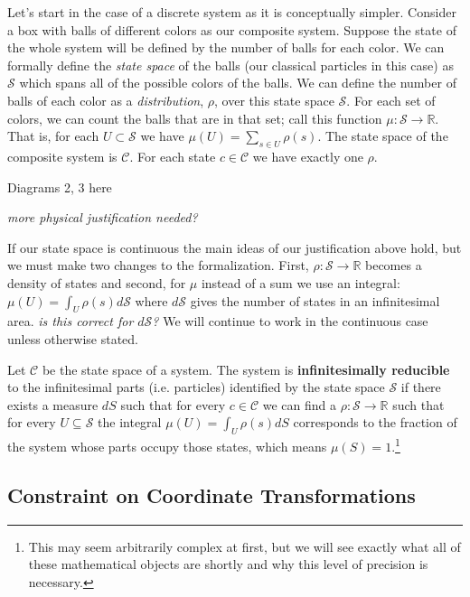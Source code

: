\documentclass{article}
\begin{document}
	Let's start in the case of a discrete system as it is conceptually simpler. Consider a box with balls of different colors as our composite system. Suppose the state of the whole system will be defined by the number of balls for each color. We can formally define the \textit{state space} of the balls (our classical particles in this case) as $\mathcal{S}$ which spans all of the possible colors of the balls. We can define the number of balls of each color as a \textit{distribution}, $\rho$, over this state space $\mathcal{S}$. For each set of colors, we can count the balls that are in that set; call this function $\mu : \mathcal{S} \to \mathbb{R}$. That is, for each $U \subset \mathcal{S}$ we have $\mu(U) = \sum_{s \in U} \rho(s)$. The state space of the composite system is $\mathcal{C}$. For each state $c \in \mathcal{C}$ we have exactly one $\rho$.
	
Diagrams 2, 3 here
	
	\emph{more physical justification needed?}

	If our state space is continuous the main ideas of our justification above hold, but we must make two changes to the formalization. First, $\rho : \mathcal{S} \to \mathbb{R}$ becomes a density of states and second, for $\mu$ instead of a sum we use an integral: $\mu(U) = \int_{U} \rho(s) d\mathcal{S}$ where $d\mathcal{S}$ gives the number of states in an infinitesimal area. \emph{is this correct for $d\mathcal{S}$?} We will continue to work in the continuous case unless otherwise stated.
	
\begin{defn}
	Let $\mathcal{C}$ be the state space of a system. The system is \textbf{infinitesimally reducible} to the infinitesimal parts (i.e. particles) identified by the state space $\mathcal{S}$ if there exists a measure $dS$ such that for every $c \in \mathcal{C}$ we can find a $\rho : \mathcal{S} \to \mathbb{R}$ such that for every $U \subseteq \mathcal{S}$ the integral $\mu(U) = \int_U \rho(s) dS$ corresponds to the fraction of the system whose parts occupy those states, which means $\mu(S) = 1$.\footnote{This may seem arbitrarily complex at first, but we will see exactly what all of these mathematical objects are shortly and why this level of precision is necessary.}
\end{defn}	
	
\subsection{Constraint on Coordinate Transformations}	
\end{document}

